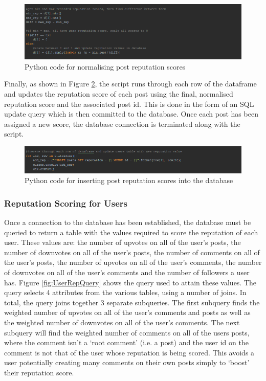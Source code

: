 \begin{figure}[H]
\centering
\includegraphics[width=\linewidth]{Images/Implementation/PostRepPython2}
\caption{Python code for normalising post reputation scores}
\label{fig:PostRepPython2}
\end{figure}

Finally, as shown in Figure \ref{fig:PostRepPython3}, the script runs through each row of the dataframe and updates the reputation score of each post using the final, normalised reputation score and the associated post id. This is done in the form of an SQL update query which is then committed to the database. Once each post has been assigned a new score, the database connection is terminated along with the script.

\begin{figure}[H]
\centering
\includegraphics[width=\linewidth]{Images/Implementation/PostRepPython3}
\caption{Python code for inserting post reputation scores into the database}
\label{fig:PostRepPython3}
\end{figure}

\subsubsection{Reputation Scoring for Users}
Once a connection to the database has been established, the database must be queried to return a table with the values required to score the reputation of each user. These values are: the number of upvotes on all of the user's posts, the number of downvotes on all of the user's posts, the number of comments on all of the user's posts, the number of upvotes on all of the user's comments, the number of downvotes on all of the user's comments and the number of followers a user has. Figure \ref{fig:UserRepQuery} shows the query used to attain these values. The query selects 4 attributes from the various tables, using a number of joins. In total, the query joins together 3 separate subqueries. The first subquery finds the weighted number of upvotes on all of the user's comments and posts as well as the weighted number of downvotes on all of the user's comments. The next subquery will find the weighted number of comments on all of the users posts, where the comment isn't a `root comment' (i.e. a post) and the user id on the comment is not that of the user whose reputation is being scored. This avoids a user potentially creating many comments on their own posts simply to `boost' their reputation score.

